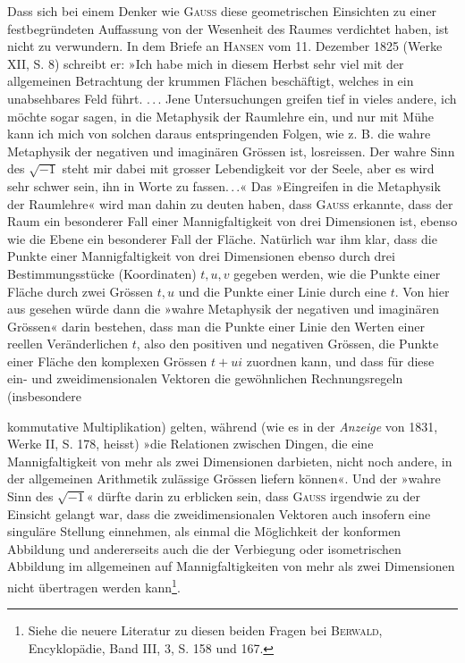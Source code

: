 Dass sich bei einem Denker wie \textsc{Gauss} diese geometrischen Einsichten
zu einer festbegründeten Auffassung von der Wesenheit des Raumes verdichtet
haben, ist nicht zu verwundern. In dem Briefe an \textsc{Hansen} vom 11. Dezember
1825 (Werke XII, S. 8) schreibt er: »Ich habe mich in diesem Herbst
sehr viel mit der allgemeinen Betrachtung der krummen Flächen beschäftigt,
welches in ein unabsehbares Feld führt. \mbox{.\,.\,.} Jene Untersuchungen greifen tief in
vieles andere, ich möchte sogar sagen, in die Metaphysik der Raumlehre ein,
und nur mit Mühe kann ich mich von solchen daraus entspringenden Folgen,
wie z. B. die wahre Metaphysik der negativen und imaginären Grössen ist,
losreissen. Der wahre Sinn des \(\sqrt{-1}\) steht mir dabei mit grosser Lebendigkeit
vor der Seele, aber es wird sehr schwer sein, ihn in Worte zu fassen\mbox{.\,.\,.}«
Das »Eingreifen in die Metaphysik der Raumlehre« wird man dahin zu deuten
haben, dass \textsc{Gauss} erkannte, dass der Raum ein besonderer Fall einer Mannigfaltigkeit
von drei Dimensionen ist, ebenso wie die Ebene ein besonderer Fall
der Fläche. Natürlich war ihm klar, dass die Punkte einer Mannigfaltigkeit
von drei Dimensionen ebenso durch drei Bestimmungsstücke (Koordinaten)
\(t,u,v\) gegeben werden, wie die Punkte einer Fläche durch zwei Grössen \(t,u\)
und die Punkte einer Linie durch eine \(t\). Von hier aus gesehen würde dann
die »wahre Metaphysik der negativen und imaginären Grössen« darin bestehen,
dass man die Punkte einer Linie den Werten einer reellen Veränderlichen \(t\),
also den positiven und negativen Grössen, die Punkte einer Fläche den komplexen
Grössen \(t+ui\) zuordnen kann, und dass für diese ein- und zweidimensionalen
Vektoren die gewöhnlichen Rechnungsregeln (insbesondere
\par\clearpage{}
\noindent kommutative Multiplikation) gelten, während (wie es in der \textit{Anzeige} von 1831, Werke
II, S. 178, heisst) »die Relationen zwischen Dingen, die eine Mannigfaltigkeit
von mehr als zwei Dimensionen darbieten, nicht noch andere, in der allgemeinen
Arithmetik zulässige Grössen liefern können«. Und der »wahre Sinn
des \(\sqrt{-1}\)« dürfte darin zu erblicken sein, dass \textsc{Gauss} irgendwie zu der Einsicht
gelangt war, dass die zweidimensionalen Vektoren auch insofern eine
singuläre Stellung einnehmen, als einmal die Möglichkeit der konformen Abbildung
und andererseits auch die der Verbiegung oder isometrischen Abbildung
im allgemeinen auf Mannigfaltigkeiten von mehr als zwei Dimensionen
nicht übertragen werden kann\footnote{Siehe die neuere Literatur zu diesen beiden Fragen bei \textsc{Berwald}, Encyklopädie, Band III, 3, S. 158 und 167.}.

